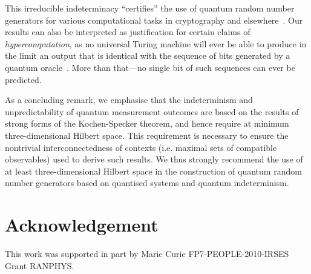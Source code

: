 \documentclass[%
 superscriptaddress,
 preprint,
 showpacs,
 showkeys,
 preprintnumbers,
  amsmath,amssymb,
  aps,
 pra,
  longbibliography,
  floatfix,
 ]{revtex4-1}
\theoremstyle{definition}
\begin{document}
This irreducible indeterminacy ``certifies'' the use of quantum random number generators for various computational tasks in cryptography and elsewhere~\cite{svozil-qct,stefanov-2000,10.1038/nature09008}.
Our results can also be interpreted as justification for certain claims of {\em hypercomputation}, %
as no universal Turing machine will ever be able to produce in the limit an output that
is identical with the sequence of bits generated by %
a quantum oracle~\cite{qrand-oracle}.
More than that---no single bit %
of such sequences can ever be predicted.

As a concluding remark, we  emphasise that the indeterminism and unpredictability of quantum measurement outcomes are based on the results of strong forms of the Kochen-Specker theorem, and hence require at minimum three-dimensional Hilbert space.
This requirement is necessary to ensure the nontrivial interconnectedness of contexts (i.e. maximal sets of compatible observables) used to derive such results.
We thus  strongly recommend the use of at least three-dimensional Hilbert space in the construction of quantum random number generators based on quantised systems and quantum indeterminism.

\section*{Acknowledgement} This work was supported in part by Marie Curie FP7-PEOPLE-2010-IRSES Grant RANPHYS.


\end{document}

